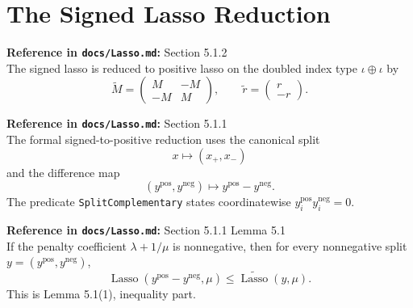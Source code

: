 \section{The Signed Lasso Reduction}

\begin{definition}\label{def:augmentedSystem}
  \textbf{Reference in \texttt{docs/Lasso.md}:} Section 5.1.2\\
The signed lasso is reduced to positive lasso on the doubled index type
$\iota\oplus\iota$ by
\[
  \widetilde M =
  \begin{pmatrix}
    M & -M\\
    -M & M
  \end{pmatrix},
  \qquad
  \widetilde r =
  \begin{pmatrix}
    r\\
    -r
  \end{pmatrix}.
\]
\end{definition}

\begin{definition}\label{def:signedSplitAPI}
  \textbf{Reference in \texttt{docs/Lasso.md}:} Section 5.1.1\\
The formal signed-to-positive reduction uses the canonical split
\[
  x \mapsto (x_+,x_-)
\]
and the difference map
\[
  (y^{\mathrm{pos}},y^{\mathrm{neg}})
  \mapsto y^{\mathrm{pos}}-y^{\mathrm{neg}}.
\]
The predicate \texttt{SplitComplementary} states coordinatewise
\(y_i^{\mathrm{pos}}y_i^{\mathrm{neg}}=0\).
\end{definition}

\begin{proposition}\label{prop:lassoSplitObjectiveLe}
  \textbf{Reference in \texttt{docs/Lasso.md}:} Section 5.1.1 Lemma 5.1\\
If the penalty coefficient $\lambda+1/\mu$ is nonnegative, then for every
nonnegative split \(y=(y^{\mathrm{pos}},y^{\mathrm{neg}})\),
\[
  \operatorname{Lasso}(y^{\mathrm{pos}}-y^{\mathrm{neg}},\mu)
  \le
  \widetilde{\operatorname{Lasso}}(y,\mu).
\]
This is Lemma 5.1(1), inequality part.
\end{proposition}

